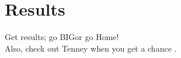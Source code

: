 \section{Results}

Get results; go \LARGE BIG\normalsize or go Home! \\
Also, check out Tenney when you get a chance \cite{Tenney2020}.